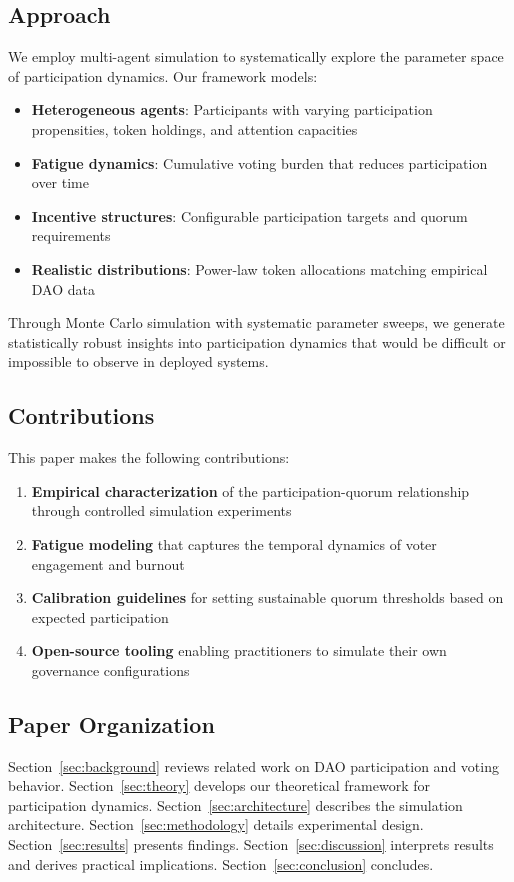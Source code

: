 \subsection{Approach}

We employ multi-agent simulation to systematically explore the parameter space of participation dynamics. Our framework models:

\begin{itemize}
    \item \textbf{Heterogeneous agents}: Participants with varying participation propensities, token holdings, and attention capacities
    \item \textbf{Fatigue dynamics}: Cumulative voting burden that reduces participation over time
    \item \textbf{Incentive structures}: Configurable participation targets and quorum requirements
    \item \textbf{Realistic distributions}: Power-law token allocations matching empirical DAO data
\end{itemize}

Through Monte Carlo simulation with systematic parameter sweeps, we generate statistically robust insights into participation dynamics that would be difficult or impossible to observe in deployed systems.

\subsection{Contributions}

This paper makes the following contributions:

\begin{enumerate}
    \item \textbf{Empirical characterization} of the participation-quorum relationship through controlled simulation experiments
    \item \textbf{Fatigue modeling} that captures the temporal dynamics of voter engagement and burnout
    \item \textbf{Calibration guidelines} for setting sustainable quorum thresholds based on expected participation
    \item \textbf{Open-source tooling} enabling practitioners to simulate their own governance configurations
\end{enumerate}

\subsection{Paper Organization}

Section~\ref{sec:background} reviews related work on DAO participation and voting behavior. Section~\ref{sec:theory} develops our theoretical framework for participation dynamics. Section~\ref{sec:architecture} describes the simulation architecture. Section~\ref{sec:methodology} details experimental design. Section~\ref{sec:results} presents findings. Section~\ref{sec:discussion} interprets results and derives practical implications. Section~\ref{sec:conclusion} concludes.
